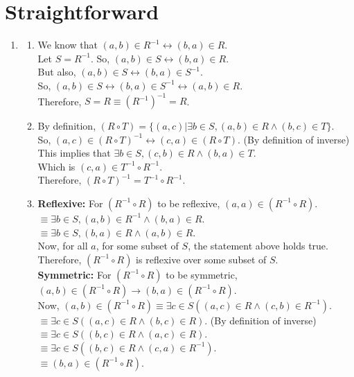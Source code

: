 \documentclass[a4paper]{article}
\begin{document}
\section{Straightforward}
    \begin{enumerate}
    
    \item \begin{enumerate}
        \item We know that $(a, b) \in R^{-1} \leftrightarrow (b, a) \in R$.\\
        Let $S = R^{-1}$. So, $(a, b) \in S \leftrightarrow (b, a) \in R$.\\
        But also, $(a, b) \in S \leftrightarrow (b, a) \in S^{-1}$.\\
        So, $(a, b) \in S \leftrightarrow (b, a) \in S^{-1} \leftrightarrow (a, b) \in R$.\\
        Therefore, $S = R \equiv (R^{-1})^{-1} = R$.\\

        \item By definition, $(R \circ T) = \{(a, c) | \exists b \in S, (a, b) \in R \land (b, c) \in T\}$.\\
        So, $(a, c) \in (R \circ T)^{-1} \leftrightarrow (c, a) \in( R \circ T)$. (By definition of inverse)\\
        This implies that $\exists b \in S, (c, b) \in R \land (b, a) \in T$.\\
        Which is $(c, a) \in T^{-1} \circ R^{-1}$.\\
        Therefore, $(R \circ T)^{-1} = T^{-1} \circ R^{-1}$.\\

        \item \textbf{Reflexive:} For $(R^{-1} \circ R)$ to be reflexive, $(a, a) \in (R^{-1} \circ R)$.\\
        $\equiv \exists b \in S, (a, b) \in R^{-1} \land (b, a) \in R$.\\
        $\equiv \exists b \in S, (b, a) \in R \land (a, b) \in R$.\\
        Now, for all $a$, for some subset of $S$, the statement above holds true.\\
        Therefore, $(R^{-1} \circ R)$ is reflexive over some subset of $S$.\\

        \textbf{Symmetric:} For $(R^{-1} \circ R)$ to be symmetric, $(a, b) \in (R^{-1} \circ R) \rightarrow (b, a) \in (R^{-1} \circ R)$.\\
        Now, $(a, b) \in (R^{-1} \circ R) \equiv \exists c \in S ( (a, c) \in R \land (c, b) \in R^{-1} )$.\\
        $\equiv \exists c \in S ( (a, c) \in R \land (b, c) \in R )$. (By definition of inverse)\\
        $\equiv \exists c \in S ( (b, c) \in R \land (a, c) \in R )$.\\
        $\equiv \exists c \in S ( (b, c) \in R \land (c, a) \in R^{-1} )$.\\
        $\equiv (b, a) \in (R^{-1} \circ R)$.\\


\end{enumerate}
\end{enumerate}
\end{document}
